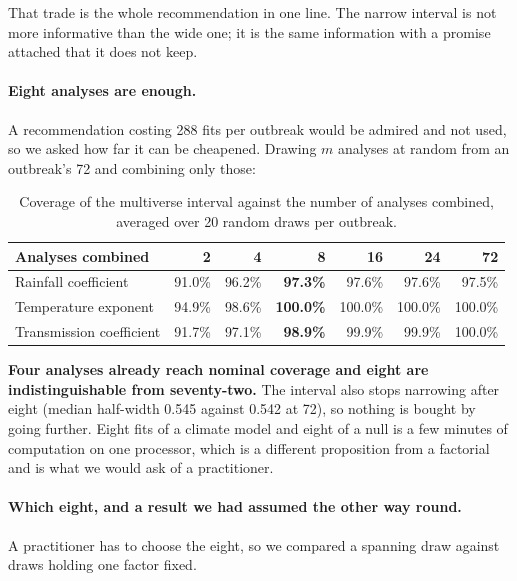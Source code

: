 \documentclass[11pt,a4paper]{article}
\begin{document}
That trade is the whole recommendation in one line. The narrow interval is not
more informative than the wide one; it is the same information with a promise
attached that it does not keep.

\paragraph{Eight analyses are enough.} A recommendation costing 288 fits per
outbreak would be admired and not used, so we asked how far it can be cheapened.
Drawing $m$ analyses at random from an outbreak's 72 and combining only those:

\begin{table}[htbp]
\centering
\caption{Coverage of the multiverse interval against the number of analyses
combined, averaged over 20 random draws per outbreak.}
\begin{tabular}{lrrrrrr}
\toprule
Analyses combined & 2 & 4 & \textbf{8} & 16 & 24 & 72 \\
\midrule
Rainfall coefficient & 91.0\% & 96.2\% & \textbf{97.3\%} & 97.6\% & 97.6\% & 97.5\% \\
Temperature exponent & 94.9\% & 98.6\% & \textbf{100.0\%} & 100.0\% & 100.0\% & 100.0\% \\
Transmission coefficient & 91.7\% & 97.1\% & \textbf{98.9\%} & 99.9\% & 99.9\% & 100.0\% \\
\bottomrule
\end{tabular}
\end{table}

\textbf{Four analyses already reach nominal coverage and eight are
indistinguishable from seventy-two.} The interval also stops narrowing after eight
(median half-width 0.545 against 0.542 at 72), so nothing is bought by going
further. Eight fits of a climate model and eight of a null is a few minutes of
computation on one processor, which is a different proposition from a factorial
and is what we would ask of a practitioner.

\paragraph{Which eight, and a result we had assumed the other way round.} A
practitioner has to choose the eight, so we compared a spanning draw against draws
holding one factor fixed.
\end{document}
